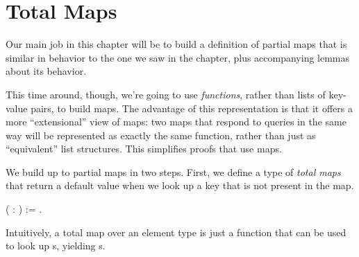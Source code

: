\documentclass[12pt]{report}
\begin{document}
\section{Total Maps}



 Our main job in this chapter will be to build a definition of
    partial maps that is similar in behavior to the one we saw in the
     chapter, plus accompanying lemmas about its behavior.


    This time around, though, we're going to use \textit{functions}, rather
    than lists of key-value pairs, to build maps.  The advantage of
    this representation is that it offers a more ``extensional'' view of
    maps: two maps that respond to queries in the same way will be
    represented as exactly the same function, rather than just as
    ``equivalent'' list structures.  This simplifies proofs that use
    maps. 

 We build up to partial maps in two steps.  First, we define a type
    of \textit{total maps} that return a default value when we look up a key
    that is not present in the map. 
\begin{coqdoccode}
\coqdocemptyline
\coqdocnoindent
{}  ( : ) :=   .\coqdoceol
\coqdocemptyline
\end{coqdoccode}
Intuitively, a total map over an element type  is just a
    function that can be used to look up s, yielding s. 
\end{document}
